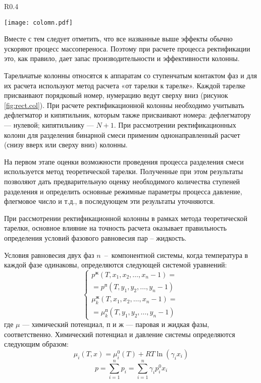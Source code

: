 \begin{wrapfigure}{R}{0.4\textwidth}
	\begin{center}
 		\texttt{[image: colomn.pdf]}
	\end{center}
	\caption{Схема ректификационной колонны} \label{fig:rect.col}
\end{wrapfigure}
 
Вместе с тем следует отметить, что все названные выше эффекты обычно ускоряют процесс массопереноса. Поэтому при расчете процесса ректификации это, как правило, дает запас производительности и эффективности колонны.

Тарельчатые колонны относятся к аппаратам со ступенчатым контактом фаз и для их расчета используют метод расчета «от тарелки к тарелке». Каждой тарелке присваивают порядковый номер, нумерацию ведут сверху вниз (рисунок \ref{fig:rect.col}). При расчете ректификационной колонны необходимо учитывать дефлегматор и кипятильник, которым также присваивают номера: дефлегматору --- нулевой; кипятильнику --- $N + 1$. При рассмотрении ректификационных колонн для разделения бинарной смеси применим однонаправленный расчет (снизу вверх или сверху вниз) колонны.


На первом этапе оценки возможности проведения процесса разделения смеси используется метод теоретической тарелки. Полученные при этом результаты позволяют дать предварительную оценку необходимого количества ступеней разделения и определить основные режимные параметры процесса давление, флегмовое число и т.д., в последующем эти результаты уточняются. 

При рассмотрении ректификационной колонны в рамках метода теоретической тарелки, основное влияние на точность расчета оказывает правильность определения условий фазового равновесия пар – жидкость. 

Условия равновесия двух фаз $n$~-- компонентной системы, когда температура в каждой фазе одинаковы, определяются следующей системой уравнений:
\begin{equation}
	\left\lbrace 
	\begin{gathered} 
	p^{ж}(T, x_1, x_2, \ldots, x_n-1)=\\=p^{п}(T, y_1, y_2, \ldots, y_n-1)\\
	\mu_k^{ж}(T, x_1, x_2, \ldots, x_n-1)=\\=\mu^{п}_k(T, y_1, y_2, \ldots, y_n-1) 
	\end{gathered} 
	\right.
\end{equation}
где $\mu$ --- химический потенциал, $п$ и $ж$ --- паровая и жидкая фазы, соответственно. Химический потенциал и давление системы определяются следующим образом:
\begin{equation}
	\mu_i(T,x)=\mu_i^0 (T) +RT \ln(\gamma_i x_i)
\end{equation}
\begin{equation}
	p=\sum\limits_{i=1}^{n} p_i= \sum\limits_{i=1}^{n} \gamma_i p_i^0 x_i
\end{equation}

